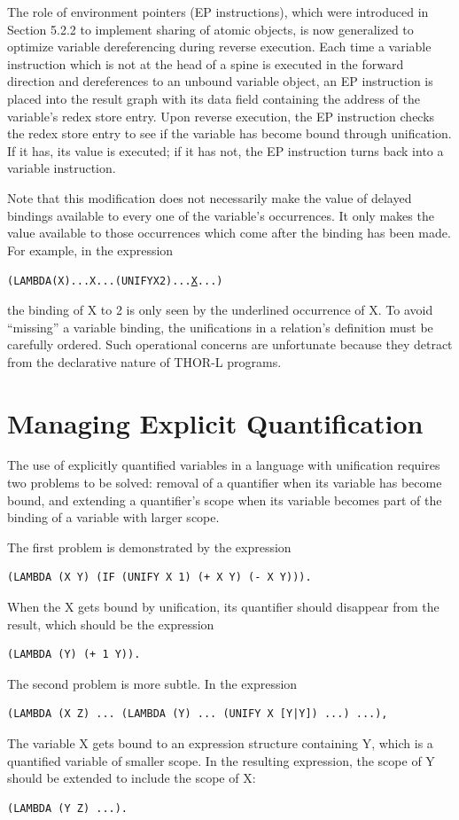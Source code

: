 The role of environment pointers (EP instructions), which were introduced in
Section 5.2.2 to implement sharing of atomic objects, is now generalized to
optimize variable dereferencing during reverse execution. Each time a variable
instruction which is not at the head of a spine is executed in the forward
direction and dereferences to an unbound variable object, an EP instruction is
placed into the result graph with its data field containing the address of the
variable's redex store entry. Upon reverse execution, the EP instruction checks
the redex store entry to see if the variable has become bound through
unification. If it has, its value is executed; if it has not, the EP instruction
turns back into a variable instruction.

Note that this modification does not necessarily make the value of delayed
bindings available to every one of the variable's occurrences. It only makes the
value available to those occurrences which come after the binding has been made.
For example, in the expression
\begin{alltt}
(LAMBDA (X) ... X ... (UNIFY X 2) ... \underline{X} ...)
\end{alltt}
the binding of X to 2 is only seen by the underlined occurrence of X. To avoid
``missing'' a variable binding, the unifications in a relation's definition must
be carefully ordered. Such operational concerns are unfortunate because they
detract from the declarative nature of THOR-L programs.

\section{Managing Explicit Quantification}

The use of explicitly quantified variables in a language with unification
requires two problems to be solved: removal of a quantifier when its variable
has become bound, and extending a quantifier's scope when its variable becomes
part of the binding of a variable with larger scope.

The first problem is demonstrated by the expression
\begin{verbatim}
(LAMBDA (X Y) (IF (UNIFY X 1) (+ X Y) (- X Y))).
\end{verbatim}
When the X gets bound by unification, its quantifier should disappear from the
result, which should be the expression
\begin{verbatim}
(LAMBDA (Y) (+ 1 Y)).
\end{verbatim}
The second problem is more subtle. In the expression
\begin{verbatim}
(LAMBDA (X Z) ... (LAMBDA (Y) ... (UNIFY X [Y|Y]) ...) ...),
\end{verbatim}
The variable X gets bound to an expression structure containing Y, which is a
quantified variable of smaller scope. In the resulting expression, the scope of
Y should be extended to include the scope of X:
\begin{verbatim}
(LAMBDA (Y Z) ...).
\end{verbatim}

